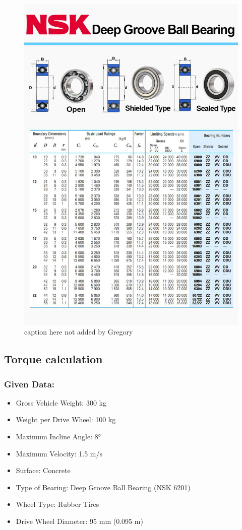 \documentclass[../../main]{subfiles}
\begin{document}
\newpage
\begin{figure}[H]
\centering
\includegraphics[width=\textwidth]{img/img1.jpg}
\caption{caption here not added by Gregory}
\end{figure}
\newpage

\subsection{Torque calculation}

\subsubsection{Given Data:}
\begin{itemize}
\item
  Gross Vehicle Weight: 300 kg
\item
  Weight per Drive Wheel: 100 kg
\item
  Maximum Incline Angle: 8°
\item
  Maximum Velocity: 1.5 m/s
\item
  Surface: Concrete
\item
  Type of Bearing: Deep Groove Ball Bearing (NSK 6201)
\item
  Wheel Type: Rubber Tires
\item
  Drive Wheel Diameter: 95 mm (0.095 m)
\end{itemize}
\end{document}
